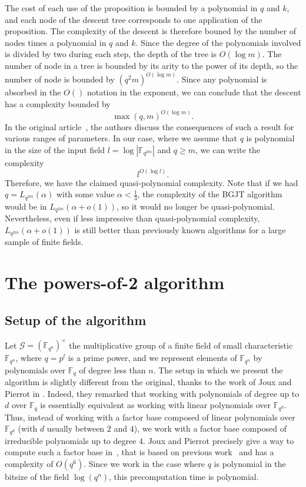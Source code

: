 \documentclass[a4paper,11pt]{article}
\theoremstyle{break}
\theoremstyle{sc}
\theoremstyle{definition}
\theoremstyle{remark}
\begin{document}
The cost of each use of the proposition is bounded by a polynomial in $q$ and
$k$, and each node of the descent tree corresponds to one application of the
proposition. The complexity of the descent is therefore bouned by the number of
nodes times a polynomial in $q$ and $k$. Since the degree of the polynomials
involved is divided by two during each step, the depth of the tree is
$O(\log m)$. The number of node in a tree is bounded by its arity to the power
of its depth, so the number of node is bounded by $(q^2m)^{O(\log m)}$. Since
any polynomial is absorbed in the $O()$ notation in the exponent, we can
conclude that the descent has a complexity bounded by
\[
  \max(q, m)^{O(\log m)}.
\]
In the original article~\cite{BGJT13}, the authors discuss the consequences of
such a result for various ranges of parameters. In our case, where we assume
that $q$ is polynomial in the size of the input field $l=\log|\mathbb{F}_{q^{2m}}|$ and
$q\geq m$, we can write the complexity
\[
  l^{O(\log l)}.
\]
Therefore, we have the claimed quasi-polynomial complexity. Note that if we had
$q = L_{q^{2m}}(\alpha)$ with some value $\alpha<\frac{1}{3}$, the complexity of the BGJT
algorithm would be in
$L_{q^{2m}}(\alpha+o(1))$, so it would no longer be quasi-polynomial. Nevertheless, even if
less impressive than quasi-polynomial complexity, $L_{q^{2m}}(\alpha+o(1))$ is
still better than previously known algorithms for a large sample of finite
fields. 
\section{The powers-of-2 algorithm}
\label{powers-of-2}
\subsection{Setup of the algorithm}

Let $\mathcal G = (\mathbb{F}_{q^n})^\times$ the multiplicative group of a finite
field of small characteristic $\mathbb{F}_{q^n}$, where $q=p^l$ is a prime
power, and we represent elements of $\mathbb{F}_{q^n}$ by polynomials over
$\mathbb{F}_q$ of degree less than $n$. The setup in which we present the algorithm is slightly different from
the original, thanks to the work of Joux and Pierrot in \cite{JP14}. Indeed,
they remarked that working with polynomials of degree up to $d$ over $\mathbb{F}_q$ is
essentially equivalent as working with linear polynomials over $\mathbb{F}_{q^d}$. Thus,
instead of working with a factor base composed of linear polynomials over
$\mathbb{F}_{q^d}$ (with $d$ usually between $2$ and $4$), we work with a
factor base composed of irreducible polynomials up to degree $4$. Joux and Pierrot
precisely give a way to compute such a factor base in~\cite{JP14}, that is based
on previous work~\cite{Joux13, BGJT13} and has a complexity of $O(q^6)$. Since
we work in the case where $q$ is polynomial in the bitsize of the field
$\log(q^n)$, this precomputation time is polynomial.
\end{document}
